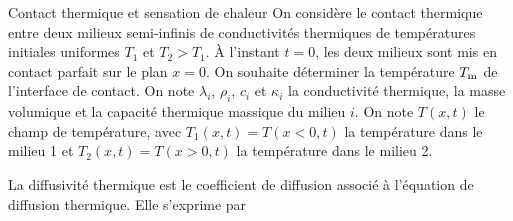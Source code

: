 \begin{exo}[PC][1][colle]{Contact thermique et sensation de chaleur}
  On considère le contact thermique entre deux milieux semi-infinis de conductivités thermiques de températures initiales uniformes $T_1$ et $T_2 > T_1$. À l'instant $t = 0$, les deux milieux sont mis en contact parfait sur le plan $x = 0$. On souhaite déterminer la température $T_{\rm m}$ de l’interface de contact. On note $\lambda_i$, $\rho_i$, $c_{i}$ et $\kappa_i$ la conductivité thermique, la masse volumique et la capacité thermique massique du milieu $i$. On note $T(x,t)$ le champ de température, avec $T_1(x,t) = T(x<0,t)$ la température dans le milieu 1 et $T_2(x,t) = T(x>0,t)$ la température dans le milieu 2. 
  \begin{quest}
    {
      La diffusivité thermique est le coefficient de diffusion associé à l’équation de diffusion thermique. Elle s’exprime par 
    }
    
    {
      
}
\end{quest}
\end{exo}

